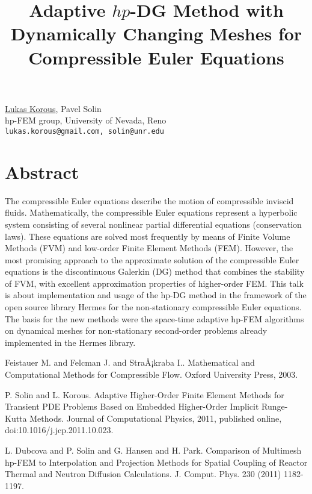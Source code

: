 \title{Adaptive $hp$-DG Method with Dynamically Changing Meshes  for Compressible Euler Equations}
 \author{} \institute{}
\maketitle
\begin{center}
{\large \underline{Lukas Korous}, Pavel Solin}\\
hp-FEM group, University of Nevada, Reno\\
{\tt lukas.korous@gmail.com, solin@unr.edu}

\end{center}

\section*{Abstract}

The compressible Euler equations describe the motion of compressible inviscid fluids. Mathematically, the compressible Euler equations represent a hyperbolic system consisting of several nonlinear partial differential equations (conservation laws). These equations are solved most frequently by means of Finite Volume Methods (FVM) and low-order Finite Element Methods (FEM). However, the most promising approach to the approximate solution of the compressible Euler equations is the discontinuous Galerkin (DG) method that combines the stability of FVM, with excellent approximation properties of higher-order FEM. This talk is about implementation and usage of the hp-DG method in the framework of the open source library Hermes for the non-stationary compressible Euler equations. The basis for the new methods were the space-time adaptive hp-FEM algorithms on dynamical meshes for non-stationary second-order problems already implemented in the Hermes library.


\begin{thebibliography}{10}

{\sc Feistauer M. and Felcman J. and StraÅ¡kraba I.}. {Mathematical  and Computational Methods for Compressible Flow}. Oxford University Press, 2003.



{\sc P. Solin and L. Korous}. {Adaptive Higher-Order Finite Element Methods for Transient PDE Problems Based on Embedded Higher-Order Implicit Runge-Kutta Methods}. Journal of Computational Physics, 2011, published online, doi:10.1016/j.jcp.2011.10.023.



{\sc L. Dubcova and P. Solin and G. Hansen and H. Park}. {Comparison of Multimesh hp-FEM to Interpolation and Projection Methods for Spatial Coupling of Reactor Thermal and Neutron Diffusion Calculations}. J. Comput. Phys. 230 (2011) 1182-1197.

\end{thebibliography}
